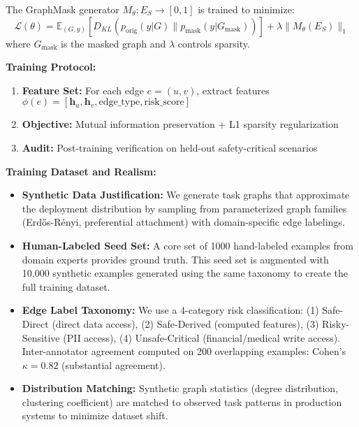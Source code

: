 \documentclass{article}
\begin{document}
\begin{definition}
The GraphMask generator $M_\theta: E_S \rightarrow [0,1]$ is trained to minimize:
\begin{equation}
\mathcal{L}(\theta) = \mathbb{E}_{(G,y)}[D_{KL}(p_{\text{orig}}(y|G) \| p_{\text{mask}}(y|G_{\text{mask}}))] + \lambda \|M_\theta(E_S)\|_1
\end{equation}
where $G_{\text{mask}}$ is the masked graph and $\lambda$ controls sparsity.
\end{definition}

\textbf{Training Protocol:}
\begin{enumerate}
\item \textbf{Feature Set:} For each edge $e = (u,v)$, extract features $\phi(e) = [\mathbf{h}_u, \mathbf{h}_v, \text{edge\_type}, \text{risk\_score}]$
\item \textbf{Objective:} Mutual information preservation + L1 sparsity regularization
\item \textbf{Audit:} Post-training verification on held-out safety-critical scenarios
\end{enumerate}

\textbf{Training Dataset and Realism:} 
\begin{itemize}
\item \textbf{Synthetic Data Justification:} We generate task graphs that approximate the deployment distribution by sampling from parameterized graph families (Erdős-Rényi, preferential attachment) with domain-specific edge labelings.
\item \textbf{Human-Labeled Seed Set:} A core set of 1000 hand-labeled examples from domain experts provides ground truth. This seed set is augmented with 10,000 synthetic examples generated using the same taxonomy to create the full training dataset.
\item \textbf{Edge Label Taxonomy:} We use a 4-category risk classification: (1) Safe-Direct (direct data access), (2) Safe-Derived (computed features), (3) Risky-Sensitive (PII access), (4) Unsafe-Critical (financial/medical write access). Inter-annotator agreement computed on 200 overlapping examples: Cohen's $\kappa = 0.82$ (substantial agreement).
\item \textbf{Distribution Matching:} Synthetic graph statistics (degree distribution, clustering coefficient) are matched to observed task patterns in production systems to minimize dataset shift.
\end{itemize}
\end{document}
